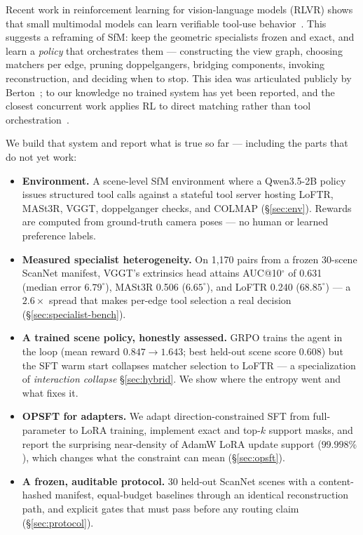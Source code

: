 \documentclass[10pt,twocolumn,letterpaper]{article}
\begin{document}
Recent work in reinforcement learning for vision-language models (RLVR)
shows that small multimodal models can learn verifiable tool-use
behavior~\cite{visualrft,dapo}. This suggests a reframing of SfM: keep the
geometric specialists frozen and exact, and learn a \emph{policy} that
orchestrates them — constructing the view graph, choosing matchers per
edge, pruning doppelgangers, bridging components, invoking reconstruction,
and deciding when to stop. This idea was articulated publicly by
Berton~\cite{bertonidea}; to our knowledge no trained system has yet been
reported, and the closest concurrent work applies RL to direct matching
rather than tool orchestration~\cite{reasonmatch}.

We build that system and report what is true so far — including the parts
that do not yet work:

\begin{itemize}[leftmargin=1.2em,itemsep=2pt]
  \item \textbf{Environment.} A scene-level SfM environment where a
  Qwen3.5-2B policy issues structured tool calls against a stateful tool
  server hosting LoFTR, MASt3R, VGGT, doppelganger checks, and COLMAP
  (\S\ref{sec:env}). Rewards are computed from ground-truth camera poses —
  no human or learned preference labels.
  \item \textbf{Measured specialist heterogeneity.} On 1,170 pairs from a
  frozen 30-scene ScanNet manifest, VGGT's extrinsics head attains
  AUC@10$^\circ$ of 0.631 (median error $6.79^\circ$), MASt3R 0.506
  ($6.65^\circ$), and LoFTR 0.240 ($68.85^\circ$) — a $2.6\times$ spread
  that makes per-edge tool selection a real decision
  (\S\ref{sec:specialist-bench}).
  \item \textbf{A trained scene policy, honestly assessed.} GRPO trains
  the agent in the loop (mean reward $0.847 \!\to\! 1.643$; best held-out
  scene score 0.608) but the SFT warm start collapses matcher selection to
  LoFTR — a specialization of \emph{interaction collapse}
  \S\ref{sec:hybrid}. We show where the entropy went and what fixes it.
  \item \textbf{OPSFT for adapters.} We adapt direction-constrained SFT
  \cite{opsft} from full-parameter to LoRA training, implement exact and
  top-$k$ support masks, and report the surprising near-density of AdamW
  LoRA update support ($99.998\%$), which changes what the constraint can
  mean (\S\ref{sec:opsft}).
  \item \textbf{A frozen, auditable protocol.} 30 held-out ScanNet scenes
  with a content-hashed manifest, equal-budget baselines through an
  identical reconstruction path, and explicit gates that must pass before
  any routing claim (\S\ref{sec:protocol}).
\end{itemize}
\end{document}
